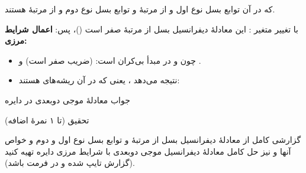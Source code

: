 \EMhold


\begin{EMunit}

که در آن  توابع بسل نوع اول و از مرتبهٔ  و  توابع بسل نوع دوم و از مرتبهٔ  هستند.


\end{EMunit}

\begin{EMunit}

با تغییر متغیر :
این معادلهٔ دیفرانسیل بسل از مرتبهٔ صفر است ()، پس:
\textbf{اعمال شرایط مرزی:}

\begin{itemize}
\tightlist
\item
  چون  و  در مبدأ بی‌کران است:  (ضریب  صفر است) و .
\item
   نتیجه می‌دهد ، یعنی  که در آن  ریشه‌های  هستند:
\end{itemize}



\end{EMunit}

\begin{EMimportant}{جواب معادلهٔ موجی دو‌بعدی در دایره}


\end{EMimportant}

\begin{EMremark}{تحقیق (تا ۱ نمرهٔ اضافه)}

گزارشی کامل از معادلهٔ دیفرانسیل بسل از مرتبهٔ  و توابع بسل نوع اول و دوم و خواص آنها و نیز حل کامل معادلهٔ دیفرانسیل موجی دوبعدی با شرایط مرزی دایره تهیه کنید (گزارش تایپ شده و در فرمت  باشد).

\end{EMremark}
